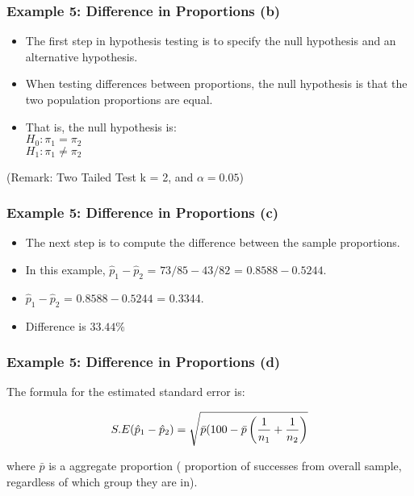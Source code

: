 \documentclass[a4]{beamer}
\begin{document}
\begin{frame}
\frametitle{Example 5: Difference in Proportions (b)}
\begin{itemize}
\item
The first step in hypothesis testing is to specify the null hypothesis and an alternative hypothesis.
\item When testing differences between proportions, the null hypothesis is that the two population proportions are equal.
\item That is, the null hypothesis is:\\
$H_0: \pi_1 = \pi_2$\\
$H_1: \pi_1 \neq \pi_2$\\
\end{itemize}
(Remark: Two Tailed Test k = 2, and $\alpha = 0.05$)
\end{frame}
\begin{frame}
\frametitle{Example 5: Difference in Proportions (c)}
\begin{itemize}
\item The next step is to compute the difference between the sample proportions.
\item In this example, $\hat{p}_1 - \hat{p}_2$ = $73/85 - 43/82$ = $0.8588 - 0.5244$.
\item $\hat{p}_1 - \hat{p}_2$ = $0.8588 - 0.5244$ = 0.3344.
\item Difference is $33.44\%$
\end{itemize}
\end{frame}



\begin{frame}
\frametitle{Example 5: Difference in Proportions (d)}
The formula for the estimated standard error is:

\[ S.E (\hat{p}_1 - \hat{p}_2)  = \sqrt{\bar{p}(100- \bar{p} \left( {1 \over n_1} + {1 \over n_2}  \right)} \]


where $\bar{p}$ is a aggregate proportion ( proportion of successes from overall sample, regardless of which group they are in).
\end{frame}

\end{document}
